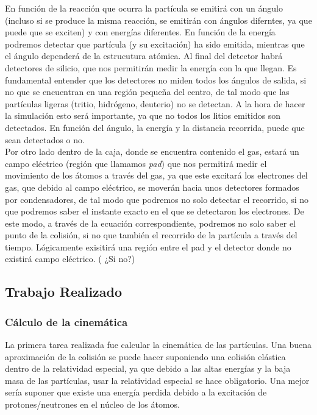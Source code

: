 \documentclass[12pt,a4paper]{article}
\numberwithin{equation}{section}
\numberwithin{figure}{section}
\begin{document}
En función de la reacción que ocurra la partícula se emitirá con un ángulo (incluso si se produce la misma reacción, se emitirán con ángulos diferntes, ya que puede que se exciten) y con energías diferentes. En función de la energía podremos detectar que partícula (y su excitación) ha sido emitida, mientras que el ángulo dependerá de la estrucutura atómica. Al final del detector habrá detectores de silicio, que nos permitirán medir la energía con la que llegan. Es fundamental entender que los detectores no miden todos los ángulos de salida, si no que se encuentran en una región pequeña del centro, de tal modo que las partículas ligeras (tritio, hidrógeno, deuterio) no se detectan. A la hora de hacer la simulación esto será importante, ya que no todos los litios emitidos son detectados. En función del ángulo, la energía y la distancia recorrida, puede que sean detectados o no. \\

Por otro lado dentro de la caja, donde se encuentra contenido el gas, estará un campo eléctrico (región que llamamos {\it pad}) que nos permitirá medir el movimiento de los átomos a través del gas, ya que este excitará los electrones del gas, que debido al campo eléctrico, se moverán hacia unos detectores formados por condensadores, de tal modo que podremos no solo detectar el recorrido, si no que podremos saber el instante exacto en el que se detectaron los electrones. De este modo, a través de la ecuación correspondiente, podremos no solo saber el punto de la colisión, si no que también el recorrido de la partícula a través del tiempo. Lógicamente exisitirá una región entre el pad y el detector donde no existirá campo eléctrico. ({\color{red} ¿Si no?}) \\


\subsection{Trabajo Realizado}

\subsubsection{Cálculo de la cinemática}

La primera tarea realizada fue calcular la cinemática de las partículas. Una buena aproximación de la colisión se puede hacer suponiendo una colisión elástica dentro de la relatividad especial, ya que debido a las altas energías y la baja masa de las partículas, usar la relatividad especial se hace obligatorio. Una mejor sería suponer que existe una energía perdida debido a la excitación de protones/neutrones en el núcleo de los átomos.  \\
\end{document}
